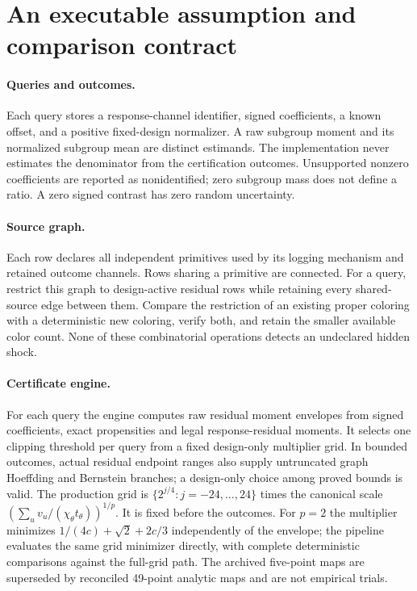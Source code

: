 \section{An executable assumption and comparison contract}

\paragraph{Queries and outcomes.}
Each query stores a response-channel identifier, signed coefficients, a known
offset, and a positive fixed-design normalizer. A raw subgroup moment and its
normalized subgroup mean are distinct estimands. The implementation never
estimates the denominator from the certification outcomes. Unsupported
nonzero coefficients are reported as nonidentified; zero subgroup mass does
not define a ratio. A zero signed contrast has zero random uncertainty.

\paragraph{Source graph.}
Each row declares all independent primitives used by its logging mechanism
and retained outcome channels. Rows sharing a primitive are connected. For a
query, restrict this graph to design-active residual rows while retaining
every shared-source edge between them. Compare the restriction of an existing
proper coloring with a deterministic new coloring, verify both, and retain
the smaller available color count. None of these combinatorial operations
detects an undeclared hidden shock.

\paragraph{Certificate engine.}
For each query the engine computes raw residual moment envelopes from signed
coefficients, exact propensities and legal response-residual moments. It
selects one clipping threshold per query from a fixed design-only multiplier
grid. In bounded outcomes, actual residual endpoint ranges also supply
untruncated graph Hoeffding and Bernstein branches; a design-only choice among
proved bounds is valid. The production grid is
$\{2^{j/4}:j=-24,\ldots,24\}$ times the canonical scale
$(\sum_u v_u/(\chi_\theta t_\theta))^{1/p}$. It is fixed before the outcomes.
For $p=2$ the multiplier minimizes
$1/(4c)+\sqrt2+2c/3$ independently of the envelope; the pipeline evaluates
the same grid minimizer directly, with complete deterministic comparisons
against the full-grid path. The archived five-point maps are superseded by
reconciled 49-point analytic maps and are not empirical trials.

